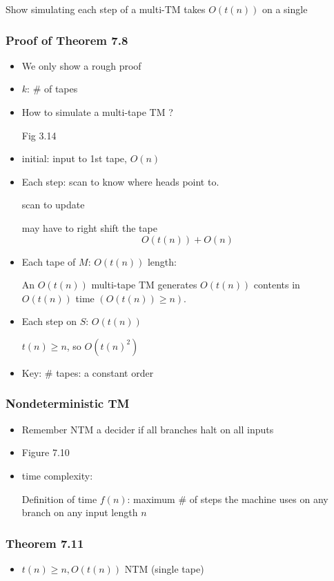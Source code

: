 \begin{frame}[allowframebreaks]
\begin{itemize}
Show simulating each step of a multi-TM
takes
$O(t(n))$ on a single

\end{itemize}\end{frame} \begin{frame}[allowframebreaks] \frametitle{Proof of Theorem 7.8}
  \begin{itemize}
\item We only show a rough proof

\item $k$: \# of tapes
\item How to simulate a multi-tape TM ?

Fig 3.14
\item initial: input to 1st tape, $O(n)$
\item Each step: scan to know where heads point to.

scan to update

may have to right shift the tape
\begin{equation*}
  O(t(n))+O(n)
\end{equation*}
\item Each tape of $M$: $O(t(n))$ length:

An $O(t(n))$ multi-tape TM generates
$O(t(n))$ contents in 
$O(t(n))$ time $(O(t(n))\geq n)$.


\item Each step on $S$: $O(t(n))$

$t(n) \geq n$, so $O(t(n)^2)$


\item Key: \# tapes: a constant order

\end{itemize}\end{frame} \begin{frame}[allowframebreaks] \frametitle{Nondeterministic TM}
  \begin{itemize}
\item Remember NTM a decider if all branches halt on all inputs
\item Figure 7.10

\item time complexity:

Definition of time $f(n)$: maximum \# of steps the machine uses on any branch
on any input length $n$

\end{itemize}\end{frame} \begin{frame}[allowframebreaks] \frametitle{Theorem 7.11}
  \begin{itemize}
  \item $t(n) \geq n, O(t(n))$ NTM (single tape)


\end{itemize}
\end{frame}
